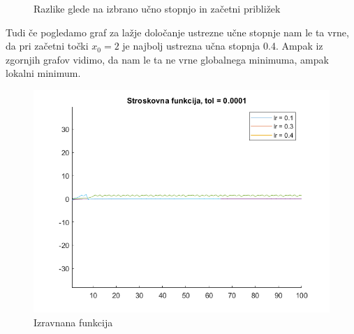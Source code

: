 \documentclass{article}
\begin{document}
\begin{figure}[!htb]
    \centering
    \caption{Razlike glede na izbrano učno stopnjo in začetni približek}
    \label{fig:foobar}
\end{figure}

\noindent Tudi če pogledamo graf za lažje določanje ustrezne učne stopnje nam le ta vrne, da pri začetni točki $x_0 = 2$ je najbolj ustrezna učna stopnja 0.4. Ampak iz zgornjih grafov vidimo, da nam le ta ne vrne globalnega minimuma, ampak lokalni minimum.
\begin{figure}[!htb]
    \centering
    \includegraphics[scale=0.4]{str_fun2}   
    \caption{Izravnana funkcija}
    \label{fig:foobar}
\end{figure}
\end{document}
